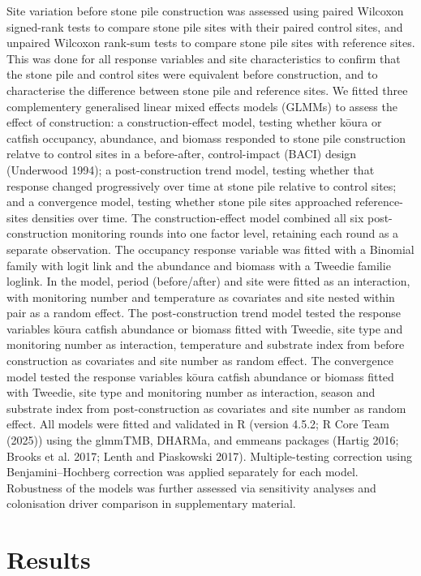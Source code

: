 \documentclass[
  12pt,
  a4paper,
]{scrbook}
\begin{document}
Site variation before stone pile construction was assessed using paired
Wilcoxon signed-rank tests to compare stone pile sites with their paired
control sites, and unpaired Wilcoxon rank-sum tests to compare stone
pile sites with reference sites. This was done for all response
variables and site characteristics to confirm that the stone pile and
control sites were equivalent before construction, and to characterise
the difference between stone pile and reference sites. We fitted three
complementery generalised linear mixed effects models (GLMMs) to assess
the effect of construction: a construction-effect model, testing whether
kōura or catfish occupancy, abundance, and biomass responded to stone
pile construction relatve to control sites in a before-after,
control-impact (BACI) design (Underwood 1994); a post-construction trend
model, testing whether that response changed progressively over time at
stone pile relative to control sites; and a convergence model, testing
whether stone pile sites approached reference-sites densities over time.
The construction-effect model combined all six post-construction
monitoring rounds into one factor level, retaining each round as a
separate observation. The occupancy response variable was fitted with a
Binomial family with logit link and the abundance and biomass with a
Tweedie familie loglink. In the model, period (before/after) and site
were fitted as an interaction, with monitoring number and temperature as
covariates and site nested within pair as a random effect. The
post-construction trend model tested the response variables kōura
catfish abundance or biomass fitted with Tweedie, site type and
monitoring number as interaction, temperature and substrate index from
before construction as covariates and site number as random effect. The
convergence model tested the response variables kōura catfish abundance
or biomass fitted with Tweedie, site type and monitoring number as
interaction, season and substrate index from post-construction as
covariates and site number as random effect. All models were fitted and
validated in R (version 4.5.2; R Core Team (2025)) using the glmmTMB,
DHARMa, and emmeans packages (Hartig 2016; Brooks et al. 2017; Lenth and
Piaskowski 2017). Multiple-testing correction using Benjamini--Hochberg
correction was applied separately for each model. Robustness of the
models was further assessed via sensitivity analyses and colonisation
driver comparison in supplementary material.


\chapter{Results}\label{results-3}
\end{document}
